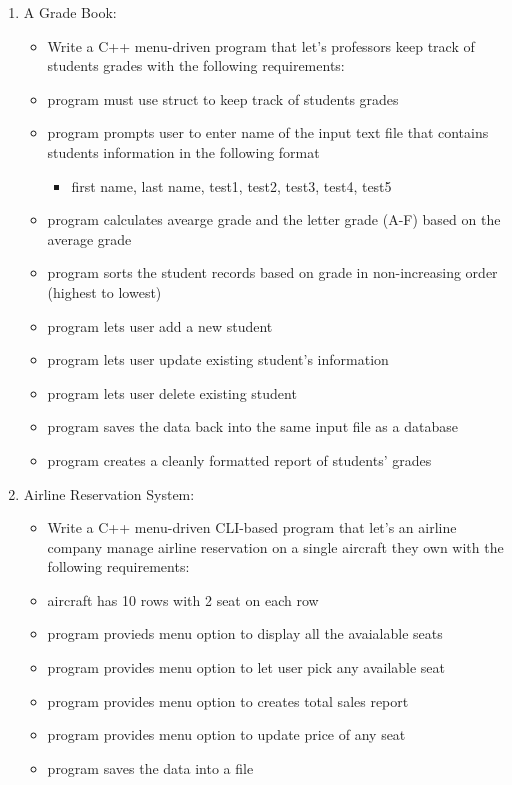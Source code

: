 \documentclass[11pt]{article}
\providecommand{\tightlist}{%
      \setlength{\itemsep}{0pt}\setlength{\parskip}{0pt}}
\begin{document}
\begin{enumerate}
\def\labelenumi{\arabic{enumi}.}
\setcounter{enumi}{4}
\tightlist
\item
  A Grade Book:

  \begin{itemize}
  \tightlist
  \item
    Write a C++ menu-driven program that let's professors keep track of
    students grades with the following requirements:
  \item
    program must use struct to keep track of students grades
  \item
    program prompts user to enter name of the input text file that
    contains students information in the following format

    \begin{itemize}
    \tightlist
    \item
      first name, last name, test1, test2, test3, test4, test5
    \end{itemize}
  \item
    program calculates avearge grade and the letter grade (A-F) based on
    the average grade
  \item
    program sorts the student records based on grade in non-increasing
    order (highest to lowest)
  \item
    program lets user add a new student
  \item
    program lets user update existing student's information
  \item
    program lets user delete existing student
  \item
    program saves the data back into the same input file as a database
  \item
    program creates a cleanly formatted report of students' grades
  \end{itemize}
\item
  Airline Reservation System:

  \begin{itemize}
  \tightlist
  \item
    Write a C++ menu-driven CLI-based program that let's an airline
    company manage airline reservation on a single aircraft they own
    with the following requirements:
  \item
    aircraft has 10 rows with 2 seat on each row
  \item
    program provieds menu option to display all the avaialable seats
  \item
    program provides menu option to let user pick any available seat
  \item
    program provides menu option to creates total sales report
  \item
    program provides menu option to update price of any seat
  \item
    program saves the data into a file
  \end{itemize}
\end{enumerate}
\end{document}
